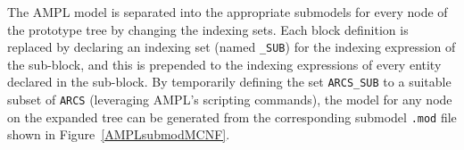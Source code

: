 \documentclass[10pt,a4paper]{book}
\begin{document}
The AMPL model is separated into the appropriate submodels for every node
of the prototype tree by changing the indexing sets.
Each block definition is replaced
by declaring an indexing set (named {\tt *\_SUB}) for the
indexing expression of the sub-block, and this is prepended to the
indexing expressions of every entity declared in the sub-block. By
temporarily defining the set {\tt ARCS\_SUB} to a suitable subset of {\tt ARCS} 
(leveraging AMPL's scripting commands), the
model for any node on the expanded tree can be generated from the
corresponding submodel {\tt *.mod} file shown in Figure~\ref{AMPLsubmodMCNF}.
\end{document}
